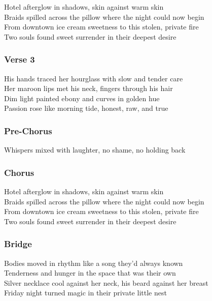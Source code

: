 Hotel afterglow in shadows, skin against warm skin\\
Braids spilled across the pillow where the night could now begin\\
From downtown ice cream sweetness to this stolen, private fire\\
Two souls found sweet surrender in their deepest desire

\subsubsection{Verse 3}\label{verse-3-13}

His hands traced her hourglass with slow and tender care\\
Her maroon lips met his neck, fingers through his hair\\
Dim light painted ebony and curves in golden hue\\
Passion rose like morning tide, honest, raw, and true

\subsubsection{Pre-Chorus}\label{pre-chorus-29}

Whispers mixed with laughter, no shame, no holding back

\subsubsection{Chorus}\label{chorus-54}

Hotel afterglow in shadows, skin against warm skin\\
Braids spilled across the pillow where the night could now begin\\
From downtown ice cream sweetness to this stolen, private fire\\
Two souls found sweet surrender in their deepest desire

\subsubsection{Bridge}\label{bridge-20}

Bodies moved in rhythm like a song they'd always known\\
Tenderness and hunger in the space that was their own\\
Silver necklace cool against her neck, his beard against her breast\\
Friday night turned magic in their private little nest

